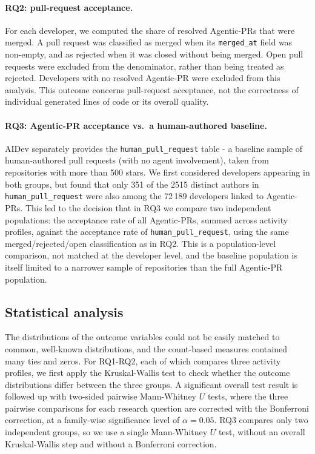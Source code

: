 \paragraph{RQ2: pull-request acceptance.}
For each developer, we computed the share of resolved Agentic-PRs that were merged. A pull request was classified as merged when its \texttt{merged\_at} field was non-empty, and as rejected when it was closed without being merged. Open pull requests were excluded from the denominator, rather than being treated as rejected. Developers with no resolved Agentic-PR were excluded from this analysis. This outcome concerns pull-request acceptance, not the correctness of individual generated lines of code or its overall quality.

\paragraph{RQ3: Agentic-PR acceptance vs.\ a human-authored baseline.}
AIDev separately provides the \texttt{human\_pull\_request} table - a baseline sample of human-authored pull requests (with no agent involvement), taken from repositories with more than 500 stars. We first considered developers appearing in both groups, but found that only 351 of the 2515 distinct authors in \texttt{human\_pull\_request} were also among the 72\,189 developers linked to Agentic-PRs. This led to the decision that in RQ3 we compare two independent populations: the acceptance rate of all Agentic-PRs, summed across activity profiles, against the acceptance rate of \texttt{human\_pull\_request}, using the same merged/rejected/open classification as in RQ2. This is a population-level comparison, not matched at the developer level, and the baseline population is itself limited to a narrower sample of repositories than the full Agentic-PR population.

\subsection{Statistical analysis}
The distributions of the outcome variables could not be easily matched to common, well-known distributions, and the count-based measures contained many ties and zeros. For RQ1-RQ2, each of which compares three activity profiles, we first apply the Kruskal-Wallis test to check whether the outcome distributions differ between the three groups. A significant overall test result is followed up with two-sided pairwise Mann-Whitney $U$ tests, where the three pairwise comparisons for each research question are corrected with the Bonferroni correction, at a family-wise significance level of $\alpha=0.05$. RQ3 compares only two independent groups, so we use a single Mann-Whitney $U$ test, without an overall Kruskal-Wallis step and without a Bonferroni correction.

